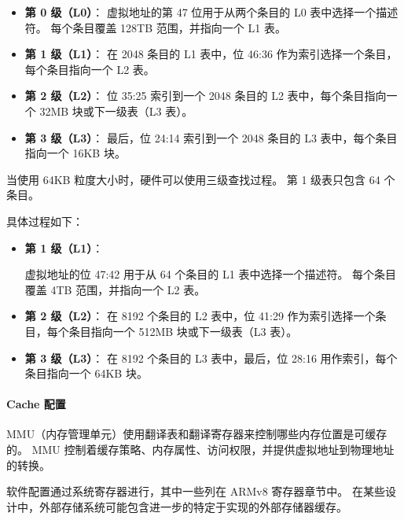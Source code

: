 \begin{itemize}
  \item
    \textbf{第 0 级（L0）}：
    虚拟地址的第 47 位用于从两个条目的 L0 表中选择一个描述符。
    每个条目覆盖 128TB 范围，并指向一个 L1 表。
  \item
    \textbf{第 1 级（L1）}：
    在 2048 条目的 L1 表中，位 46:36 作为索引选择一个条目，每个条目指向一个 L2 表。
  \item
    \textbf{第 2 级（L2）}：
    位 35:25 索引到一个 2048 条目的 L2 表中，每个条目指向一个 32MB 块或下一级表（L3 表）。
  \item
    \textbf{第 3 级（L3）}：
    最后，位 24:14 索引到一个 2048 条目的 L3 表中，每个条目指向一个 16KB 块。
\end{itemize}



当使用 64KB 粒度大小时，硬件可以使用三级查找过程。
第 1 级表只包含 64 个条目。

具体过程如下：

\begin{itemize}
  \item
    \textbf{第 1 级（L1）}：

    虚拟地址的位 47:42 用于从 64 个条目的 L1 表中选择一个描述符。
    每个条目覆盖 4TB 范围，并指向一个 L2 表。
  \item
    \textbf{第 2 级（L2）}：
    在 8192 个条目的 L2 表中，位 41:29 作为索引选择一个条目，每个条目指向一个 512MB 块或下一级表（L3 表）。
  \item
    \textbf{第 3 级（L3）}：
    在 8192 个条目的 L3 表中，最后，位 28:16 用作索引，每个条目指向一个 64KB 块。
\end{itemize}


\paragraph{Cache 配置}

MMU（内存管理单元）使用翻译表和翻译寄存器来控制哪些内存位置是可缓存的。
MMU 控制着缓存策略、内存属性、访问权限，并提供虚拟地址到物理地址的转换。


软件配置通过系统寄存器进行，其中一些列在 ARMv8 寄存器章节中。
在某些设计中，外部存储系统可能包含进一步的特定于实现的外部存储器缓存。

